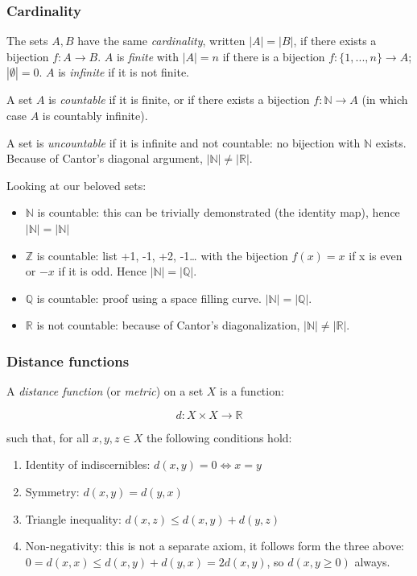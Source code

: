 \documentclass{article}
\begin{document}
\subsubsection{Cardinality}\label{cardinality}

The sets \(A, B\) have the same \emph{cardinality}, written
\(|A| = |B|\), if there exists a bijection \(f: A\rightarrow B\). \(A\)
is \emph{finite} with \(|A| = n\) if there is a bijection
\(f:\{1, ..., n\}\rightarrow A\); \(|\emptyset|=0\). \(A\) is
\emph{infinite} if it is not finite.

A set \(A\) is \emph{countable} if it is finite, or if there exists a
bijection \(f:
\mathbb{N} \rightarrow A\) (in which case \(A\) is countably infinite).

A set is \emph{uncountable} if it is infinite and not countable: no
bijection with \(\mathbb{N}\) exists. Because of Cantor's diagonal
argument, \(|\mathbb{N}| \neq
|\mathbb{R}|\).

Looking at our beloved sets:

\begin{itemize}
\tightlist
\item
  \(\mathbb{N}\) is countable: this can be trivially demonstrated (the
  identity map), hence \(|\mathbb{N}| = |\mathbb{N}|\)
\item
  \(\mathbb{Z}\) is countable: list +1, -1, +2, -1\ldots{} with the
  bijection \(f(x) =
  x\) if x is even or \(-x\) if it is odd. Hence
  \(|\mathbb{N}| = |\mathbb{Q}|\).
\item
  \(\mathbb{Q}\) is countable: proof using a space filling curve.
  \(|\mathbb{N}| =
  |\mathbb{Q}|\).
\item
  \(\mathbb{R}\) is not countable: because of Cantor's diagonalization,
  \(|\mathbb{N}| \neq |\mathbb{R}|\).
\end{itemize}

\subsubsection{Distance functions}\label{distance-functions}

A \emph{distance function} (or \emph{metric}) on a set \(X\) is a
function:

\[d: X \times X \rightarrow \mathbb{R}\]

such that, for all \(x, y, z\in X\) the following conditions hold:

\begin{enumerate}
\def\labelenumi{\arabic{enumi}.}
\tightlist
\item
  Identity of indiscernibles: \(d(x, y) = 0 \iff x = y\)
\item
  Symmetry: \(d(x, y) = d(y, x)\)
\item
  Triangle inequality: \(d(x, z) \le d(x, y) + d(y, z)\)
\item
  Non-negativity: this is not a separate axiom, it follows form the
  three above: \(0 = d(x, x) \le d(x, y) + d(y, x) = 2 d(x, y)\), so
  \(d(x, y \ge 0)\) always.
\end{enumerate}
\end{document}
